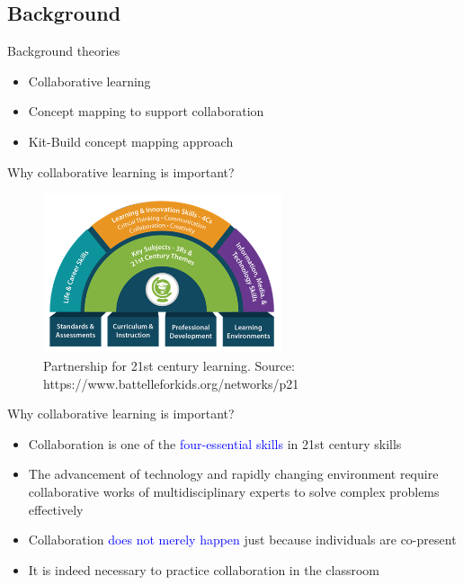 \subsection{Background}

\begin{frame}{Background theories}
    \begin{itemize}
        \item Collaborative learning
        \item Concept mapping to support collaboration
        \item Kit-Build concept mapping approach
    \end{itemize}
\end{frame}

\begin{frame}{Why collaborative learning is important?}

    \begin{figure}[tb]
        \begin{center}
            \includegraphics[width=70mm]{images/p21centuryskills.png}
        \end{center}
        \caption{Partnership for 21st century learning. Source: https://www.battelleforkids.org/networks/p21}
        \label{intro::p21}
    \end{figure}
\end{frame}

\begin{frame}{Why collaborative learning is important?}

    \begin{itemize}
        \item<1->  Collaboration is one of the \textcolor{blue}{four-essential skills} in 21st century skills
        \item<1->  The advancement of technology and rapidly changing environment require 
        collaborative works of multidisciplinary experts to solve complex problems effectively
        \item<2->  Collaboration \textcolor{blue}{does not merely happen} just because individuals are co-present
        \item<2->  It is indeed necessary to practice collaboration in the classroom
    \end{itemize}
\end{frame}

